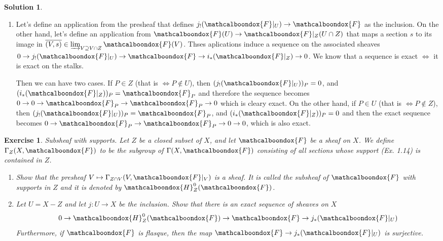 \documentclass[12pt]{article}
\newtheorem{ex}{Exercise}[section]
\theoremstyle{definition}
\newtheorem*{sol}{Solution}
\newcommand{\sF}{\ensuremath{\mathcalboondox{F}}}
\newcommand{\sH}{\ensuremath{\mathcalboondox{H}}}
\begin{document}
\begin{sol}
\begin{enumerate}[label=\alph*)]
		\item Let's define an application from the presheaf that defines $j_{!}(\sF|_{U}) \to \sF$ as the inclusion. On the other hand, let's define an application from $\sF(U) \to \sF|_Z (U \cap Z)$ that maps a section $s$ to its image in $\overline{(V,s)} \in \varinjlim_{V \supseteq V \cap Z} \sF(V)$.  Thses aplications induce a sequence on the associated sheaves $0 \to j_{!}(\sF|_{U}) \to \sF \to i_{*}(\sF|_{Z}) \to 0$. We know that a sequence is exact $\iff$ it is exact on the stalks. 

		Then we can have two cases. If $P \in Z$ (that is $\iff P \notin U$), then $(j_{!}(\sF|_U))_P = 0$, and $(i_{*}(\sF|_Z))_P = \sF_P$ and therefore the sequence becomes $0 \to 0 \to \sF_P \to \sF_P \to 0$ which is cleary exact. On the other hand, if $P \in U$ (that is $\iff P \notin Z$), then $(j_{!}(\sF|_U))_P = \sF_P$, and $(i_{*}(\sF|_Z))_P = 0$ and then the exact sequence becomes $0 \to \sF_P \to \sF_P \to 0 \to 0$, which is also exact.

	\end{enumerate}

\end{sol}

\begin{ex}
	Subsheaf with supports. Let $Z$ be a closed subset of $X$, and let $\sF$ be a sheaf on $X$. We define $\Gamma_Z(X, \sF)$ to be the subgroup of $\Gamma(X,\sF)$ consisting of all sections whose support (Ex. 1.14) is contained in $Z$.
	\begin{enumerate}[label=\alph*)]
		\item Show that the presheaf $V \mapsto \Gamma_{Z \cap V}(V, \sF|_V)$ is a sheaf. It is called the subsheaf of $\sF$ with supports in $Z$ and it is denoted by $\sH^{0}_Z(\sF)$.

		\item Let $U = X-Z$ and let $j: U \to X$ be the inclusion. Show that there is an exact sequence of sheaves on $X$
		\[
		 0 \to \sH^{0}_Z(\sF) \to \sF \to j_{*}(\sF|_U)
		\]
		Furthermore, if $\sF$ is flasque, then the map $\sF \to j_{*}(\sF|_U)$ is surjective.
	\end{enumerate}
\end{ex}
\end{document}
